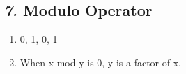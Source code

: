 \documentclass[12pt, english]{article}
\begin{document}
\subsection*{\emph{7.} Modulo Operator}
\vspace{10pt}

\begin{enumerate}
    \item[a.] 0, 1, 0, 1
    \item[b.] When x mod y is 0, y is a factor of x. 
\end{enumerate}
\vspace{10pt}
\end{document}
